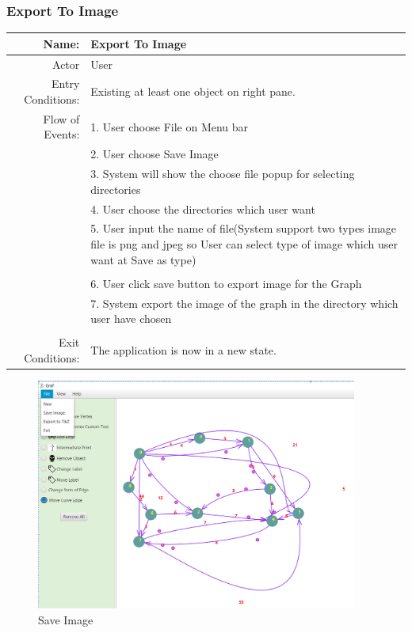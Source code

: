 \documentclass[a4paper,10pt]{article}
\begin{document}
	\subsubsection{Export To Image}
	\begin{tabular}{|r|l|}
\hline
Name: & Export To Image \\
\hline
Actor & User \\
\hline
Entry Conditions: & Existing at least one object on right pane. \\
\hline
Flow of Events: & 1. User choose File on Menu bar \\
& 2. User choose Save Image  \\
& 3. System will show the choose file popup for selecting directories \\
& 4. User choose the directories which user want\\
& 5. User input the name of file(System support two types image file is png and jpeg so User can select type of image which user want at Save as type)\\
\\
& 6. User click save button to export image for the Graph\\
& 7. System export the image of the graph in the directory which user have chosen\\
\\
\hline
Exit Conditions: & The application is now in a new state. \\
\hline

\end{tabular}
\begin{figure}[H]
		\centering
		\includegraphics[height = 3in]{saveImage.png}
		\caption[Optional caption]{Save Image}
		\label{fig:Repository}
	\end{figure}
\end{document}
